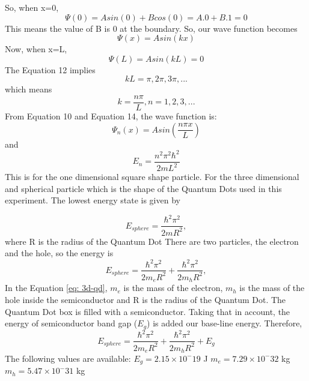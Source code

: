 \documentclass[12pt]{report}
\begin{document}
So, when x=0,
\begin{equation}
    \Psi(0) = Asin(0) + Bcos(0) = A.0 + B.1 = 0
\end{equation}
This means the value of B is 0 at the boundary. So, our wave function becomes
\begin{equation}
    \Psi(x) = Asin(kx)
\end{equation}
Now, when x=L,
\begin{equation}
    \Psi(L) = Asin(kL) = 0
\end{equation}
The Equation 12 implies
\begin{equation}
    kL = \pi, 2\pi, 3\pi, ...
\end{equation}
which means
\begin{equation}
    k = \frac{n\pi}{L}, n=1, 2, 3, ...
\end{equation}
From Equation 10 and Equation 14, the wave function is:
\begin{equation}
    \Psi_n(x) = Asin(\frac{n\pi x}{L})
\end{equation}
and
\begin{equation}
    E_n = \frac{n^2\pi^2\hbar^2}{2mL^2}
\end{equation}
This is for the one dimensional square shape particle. \newpage 
For the three dimensional and spherical particle which is the shape of the Quantum Dots used in this experiment. The lowest energy state is given by 

\begin{equation}
    E_{sphere} = \frac{\hbar^2 \pi^2}{2mR^2},
\end{equation}
where R is the radius of the Quantum Dot
\newline
There are two particles, the electron and the hole, so the energy is
\begin{equation}
    E_{sphere} = \frac{\hbar^2 \pi^2}{2m_eR^2} + \frac{\hbar^2 \pi^2}{2m_hR^2}, \label{eq: 3d-qd}
\end{equation}
In the Equation \eqref{eq: 3d-qd}, $m_e$ is the mass of the electron, $m_h$ is the mass of the hole inside the semiconductor and R is the radius of the Quantum Dot.
\newline
The Quantum Dot box is filled with a semiconductor. Taking that in account, the energy of semiconductor band gap ($E_g$) is added our base-line energy. Therefore, 
\begin{equation}
     E_{sphere} = \frac{\hbar^2 \pi^2}{2m_eR^2} + \frac{\hbar^2 \pi^2}{2m_hR^2} + E_g 
\end{equation}
The following values are available:
\newline
$E_g = 2.15 \times 10^-19$ J
\newline
$m_e = 7.29 \times 10^-32$ kg
\newline
$m_h = 5.47 \times 10^-31$ kg
\end{document}
